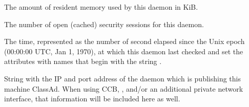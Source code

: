 \begin{description}
\item[\AdAttr{MonitorSelfResidentSetSize}:] The amount of resident memory
  used by this daemon in KiB.

\item[\AdAttr{MonitorSelfSecuritySessions}:] The number of open (cached)
  security sessions for this daemon.

\item[\AdAttr{MonitorSelfTime}:] The  time, represented as the number of
  second elapsed since the Unix epoch (00:00:00 UTC, Jan 1, 1970),
  at which this daemon last checked and set the attributes with names that
  begin with the string .
  
\item[\AdAttr{MyAddress}:] String with the IP and port address of the
 daemon which is publishing this machine ClassAd.
When using CCB, , and/or an additional private
network interface, that information will be included here as well.


\end{description}

